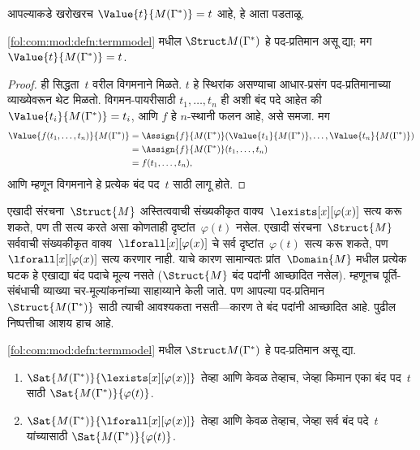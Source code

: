 आपल्याकडे खरोखरच $\Value{t}{M(\Gamma^*)} = t$ आहे, हे आता पडताळू.

\begin{lem}
\label{fol:com:mod:lem:val-in-termmodel} \ref{fol:com:mod:defn:termmodel} मधील
$\Struct M(\Gamma^*)$ हे पद-प्रतिमान असू द्या; मग
$\Value{t}{M(\Gamma^*)} = t$.
\end{lem}
\begin{proof}
 ही सिद्धता~$t$ वरील विगमनाने मिळते. $t$ हे स्थिरांक असण्याचा
 आधार-प्रसंग पद-प्रतिमानाच्या व्याख्येवरून थेट मिळतो. विगमन-पायरीसाठी
 $t_1, \ldots, t_n$ ही अशी बंद पदे आहेत की
 $\Value{t_i}{M(\Gamma^*)} = t_i$, आणि $f$ हे $n$-स्थानी
 फलन आहे, असे समजा. मग
\begin{align*}
\Value{f(t_1,\ldots,t_n)}{M(\Gamma^*)} &= \Assign{f}{M(\Gamma^*)}(\Value{t_1}
 {M(\Gamma^*)},
\ldots, \Value{t_n}{M(\Gamma^*)}) \\
&= \Assign{f}{M(\Gamma^*)}(t_1, \dots, t_n) \\
&= f(t_1,\dots, t_n),
\end{align*}
आणि म्हणून विगमनाने हे प्रत्येक बंद पद~$t$ साठी लागू होते.
\end{proof}



\begin{explain}
  एखादी संरचना~$\Struct{M}$ अस्तित्ववाची संख्यकीकृत
    वाक्य~$\lexists[x][\varphi(x)]$ सत्य करू शकते, पण ती सत्य करते
    असा कोणताही दृष्टांत~$\varphi(t)$ नसेल.
  एखादी संरचना~$\Struct{M}$ सर्ववाची संख्यकीकृत
    वाक्य~$\lforall[x][\varphi(x)]$ चे सर्व दृष्टांत~$\varphi(t)$ सत्य करू
    शकते, पण~$\lforall[x][\varphi(x)]$ सत्य करणार नाही. याचे कारण सामान्यतः
  प्रांत~$\Domain{M}$ मधील प्रत्येक घटक हे एखाद्या बंद पदाचे
  मूल्य नसते ($\Struct{M}$ बंद पदांनी आच्छादित नसेल). म्हणूनच
  पूर्ति-संबंधाची व्याख्या चर-मूल्यांकनांच्या साहाय्याने केली जाते. पण आपल्या
  पद-प्रतिमान~$\Struct{M(\Gamma^*)}$ साठी त्याची आवश्यकता नसती---कारण
  ते बंद पदांनी आच्छादित आहे. पुढील निष्पत्तीचा आशय हाच आहे.
\end{explain}

\begin{prop}
\label{fol:com:mod:prop:quant-termmodel}
\ref{fol:com:mod:defn:termmodel} मधील $\Struct M(\Gamma^*)$ हे पद-प्रतिमान असू द्या.
\begin{enumerate}
\item $\Sat{M(\Gamma^*)}{\lexists[x][\varphi(x)]}$ तेव्हा आणि केवळ तेव्हाच,
  जेव्हा किमान एका बंद पद~$t$ साठी $\Sat{M(\Gamma^*)}{\varphi(t)}$.
\item $\Sat{M(\Gamma^*)}{\lforall[x][\varphi(x)]}$ तेव्हा आणि केवळ तेव्हाच,
  जेव्हा सर्व बंद पदे~$t$ यांच्यासाठी $\Sat{M(\Gamma^*)}{\varphi(t)}$.
\end{enumerate}
\end{prop}

